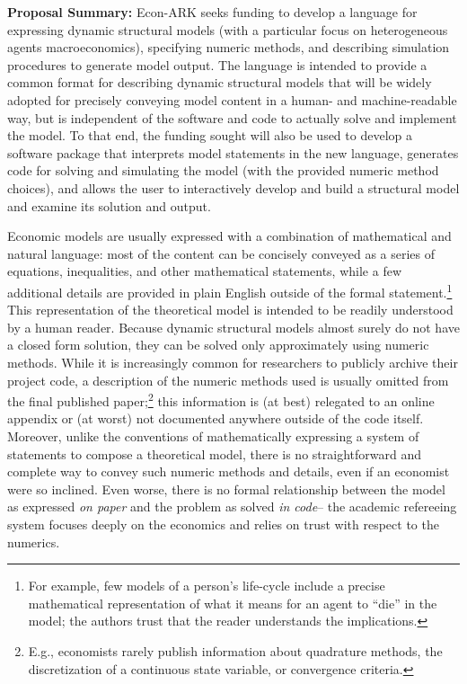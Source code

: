 \documentclass[12pt,pdftex,letterpaper]{article}
\begin{document}
\vspace{0.5cm}

\noindent \textbf{Proposal Summary:} Econ-ARK seeks funding to develop a language for expressing dynamic structural models (with a particular focus on heterogeneous agents macroeconomics), specifying numeric methods, and describing simulation procedures to generate model output. The language is intended to provide a common format for describing dynamic structural models that will be widely adopted for precisely conveying model content in a human- and machine-readable way, but is independent of the software and code to actually solve and implement the model. To that end, the funding sought will also be used to develop a software package that interprets model statements in the new language, generates code for solving and simulating the model (with the provided numeric method choices), and allows the user to interactively develop and build a structural model and examine its solution and output.

Economic models are usually expressed with a combination of mathematical and natural language: most of the content can be concisely conveyed as a series of equations, inequalities, and other mathematical statements, while a few additional details are provided in plain English outside of the formal statement.\footnote{For example, few models of a person's life-cycle include a precise mathematical representation of what it means for an agent to ``die'' in the model; the authors trust that the reader understands the implications.} This representation of the theoretical model is intended to be readily understood by a human reader. Because dynamic structural models almost surely do not have a closed form solution, they can be solved only approximately using numeric methods. While it is increasingly common for researchers to publicly archive their project code, a description of the numeric methods used is usually omitted from the final published paper;\footnote{E.g., economists rarely publish information about quadrature methods, the discretization of a continuous state variable, or convergence criteria.} this information is (at best) relegated to an online appendix or (at worst) not documented anywhere outside of the code itself. Moreover, unlike the conventions of mathematically expressing a system of statements to compose a theoretical model, there is no straightforward and complete way to convey such numeric methods and details, even if an economist were so inclined. Even worse, there is no formal relationship between the model as expressed \textit{on paper} and the problem as solved \textit{in code}-- the academic refereeing system focuses deeply on the economics and relies on trust with respect to the numerics.
\end{document}
